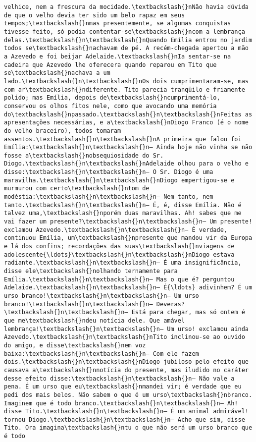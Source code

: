 \begin{Verbatim}[commandchars=\\\{\}]
velhice, nem a frescura da mocidade.\textbackslash{}nNão havia dúvida de que o velho devia ter sido um belo rapaz em seus tempos;\textbackslash{}nmas presentemente, se algumas conquistas tivesse feito, só podia contentar-se\textbackslash{}ncom a lembrança delas.\textbackslash{}n\textbackslash{}nQuando Emília entrou no jardim todos se\textbackslash{}nachavam de pé. A recém-chegada apertou a mão a Azevedo e foi beijar Adelaide.\textbackslash{}nIa sentar-se na cadeira que Azevedo lhe oferecera quando reparou em Tito que se\textbackslash{}nachava a um lado.\textbackslash{}n\textbackslash{}nOs dois cumprimentaram-se, mas com ar\textbackslash{}ndiferente. Tito parecia tranqüilo e friamente polido; mas Emília, depois de\textbackslash{}ncumprimentá-lo, conservou os olhos fitos nele, como que avocando uma memória do\textbackslash{}npassado.\textbackslash{}n\textbackslash{}nFeitas as apresentações necessárias, e a\textbackslash{}nDiogo Franco (é o nome do velho braceiro), todos tomaram assentos.\textbackslash{}n\textbackslash{}nA primeira que falou foi Emília:\textbackslash{}n\textbackslash{}n— Ainda hoje não vinha se não fosse a\textbackslash{}nobsequiosidade do Sr. Diogo.\textbackslash{}n\textbackslash{}nAdelaide olhou para o velho e disse:\textbackslash{}n\textbackslash{}n— O Sr. Diogo é uma maravilha.\textbackslash{}n\textbackslash{}nDiogo empertigou-se e murmurou com certo\textbackslash{}ntom de modéstia:\textbackslash{}n\textbackslash{}n— Nem tanto, nem tanto.\textbackslash{}n\textbackslash{}n— É, é, disse Emília. Não é talvez uma,\textbackslash{}nporém duas maravilhas. Ah! sabes que me vai fazer um presente?\textbackslash{}n\textbackslash{}n— Um presente! exclamou Azevedo.\textbackslash{}n\textbackslash{}n— É verdade, continuou Emília, um\textbackslash{}npresente que mandou vir da Europa e lá dos confins; recordações das suas\textbackslash{}nviagens de adolescente{\ldots}\textbackslash{}n\textbackslash{}nDiogo estava radiante.\textbackslash{}n\textbackslash{}n— É uma insignificância, disse ele\textbackslash{}nolhando ternamente para Emília.\textbackslash{}n\textbackslash{}n— Mas o que é? perguntou Adelaide.\textbackslash{}n\textbackslash{}n— É{\ldots} adivinhem? É um urso branco!\textbackslash{}n\textbackslash{}n— Um urso branco!\textbackslash{}n\textbackslash{}n— Deveras?\textbackslash{}n\textbackslash{}n— Está para chegar, mas só ontem é que me\textbackslash{}ndeu notícia dele. Que amável lembrança!\textbackslash{}n\textbackslash{}n— Um urso! exclamou ainda Azevedo.\textbackslash{}n\textbackslash{}nTito inclinou-se ao ouvido do amigo, e disse\textbackslash{}nem voz baixa:\textbackslash{}n\textbackslash{}n— Com ele fazem dois.\textbackslash{}n\textbackslash{}nDiogo jubiloso pelo efeito que causava a\textbackslash{}nnotícia do presente, mas iludido no caráter desse efeito disse:\textbackslash{}n\textbackslash{}n— Não vale a pena. É um urso que eu\textbackslash{}nmandei vir; é verdade que eu pedi dos mais belos. Não sabem o que é um urso\textbackslash{}nbranco. Imaginem que é todo branco.\textbackslash{}n\textbackslash{}n— Ah! disse Tito.\textbackslash{}n\textbackslash{}n— É um animal admirável! tornou Diogo.\textbackslash{}n\textbackslash{}n— Acho que sim, disse Tito. Ora imagina\textbackslash{}ntu o que não será um urso branco que é todo 
\end{Verbatim}
